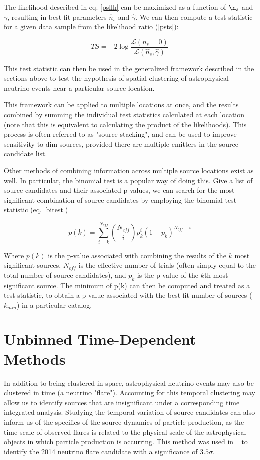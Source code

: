 The likelihood described in eq. \ref{psllh} can be maximized as a function of $\n_s$ and $\gamma$, resulting in best fit parameters $\hat{n}_s$ and $\hat{\gamma}$. We can then compute a test statistic for a given data sample from the likelihood ratio (\ref{psts}):

\begin{equation}
    TS = -2 \log \frac{\mathcal{L}(n_s=0)}{\mathcal{L}(\hat{n}_s, \hat{\gamma})}
    \label{psts}
\end{equation}

This test statistic can then be used in the generalized framework described in the sections above to test the hypothesis of spatial clustering of astrophysical neutrino events near a particular source location. 

This framework can be applied to multiple locations at once, and the results combined by summing the individual test statistics calculated at each location (note that this is equivalent to calculating the product of the likelihoods). This process is often referred to as "source stacking", and can be used to improve sensitivity to dim sources, provided there are multiple emitters in the source candidate list. 

Other methods of combining information across multiple source locations exist as well. In particular, the binomial test is a popular way of doing this. Give a list of source candidates and their associated p-values, we can search for the most significant combination of source candidates by employing the binomial test-statistic (eq. \ref{bitest})

\begin{equation}
    p(k) = \sum_{i=k}^{N_{eff}} \binom{N_{eff}}{i}p_k^i(1-p_k)^{N_{eff}-i}
    \label{bitest}
\end{equation}

Where $p(k)$ is the p-value associated with combining the results of the $k$ most significant sources, $N_{eff}$ is the effective number of trials (often simply equal to the total number of source candidates), and $p_k$ is the p-value of the $k$th most significant source. The minimum of p(k) can then be computed and treated as a test statistic, to obtain a p-value associated with the best-fit number of sources ($k_{min}$) in a particular catalog. 


\section{Unbinned Time-Dependent Methods}
In addition to being clustered in space, astrophysical neutrino events may also be clustered in time (a neutrino "flare"). Accounting for this temporal clustering may allow us to identify sources that are insignificant under a corresponding time integrated analysis. Studying the temporal variation of source candidates can also inform us of the specifics of the source dynamics of particle production, as the time scale of observed flares is related to the physical scale of the astrophysical objects in which particle production is occurring. This method was used in ~\cite{TXS_Archival} to identify the 2014 neutrino flare candidate with a significance of $3.5 \sigma$. 

